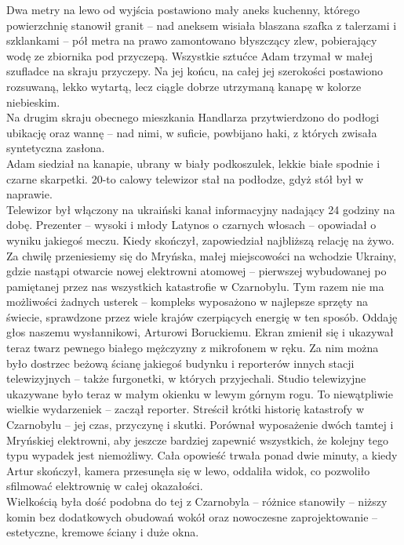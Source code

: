 \documentclass[../MAIN.tex]{subfiles}
\begin{document}
Dwa metry na lewo od wyjścia postawiono mały aneks kuchenny, którego powierzchnię stanowił granit -- nad aneksem wisiała blaszana szafka z talerzami i szklankami -- pół metra na prawo zamontowano błyszczący zlew, pobierający wodę ze zbiornika pod przyczepą. Wszystkie sztućce Adam trzymał w małej szufladce na skraju przyczepy. Na jej końcu, na całej jej szerokości postawiono rozsuwaną, lekko wytartą, lecz ciągle dobrze utrzymaną kanapę w kolorze niebieskim. \\
Na drugim skraju obecnego mieszkania Handlarza przytwierdzono do podłogi ubikację oraz wannę -- nad nimi, w suficie, powbijano haki, z których zwisała syntetyczna zasłona. \\
Adam siedział na kanapie, ubrany w biały podkoszulek, lekkie białe spodnie i czarne skarpetki. 20-to calowy telewizor stał na podłodze, gdyż stół był w naprawie. \\
Telewizor był włączony na ukraiński kanał informacyjny nadający 24 godziny na dobę. Prezenter -- wysoki i młody Latynos o czarnych włosach -- opowiadał o wyniku jakiegoś meczu. Kiedy skończył, zapowiedział najbliższą relację na żywo.
%
\sx Za chwilę przeniesiemy się do Mryńska, małej miejscowości na wchodzie Ukrainy, gdzie nastąpi otwarcie nowej elektrowni atomowej -- pierwszej wybudowanej po pamiętanej przez nas wszystkich katastrofie w Czarnobylu. Tym razem nie ma możliwości żadnych usterek -- kompleks wyposażono w najlepsze sprzęty na świecie, sprawdzone przez wiele krajów czerpiących energię w ten sposób. Oddaję głos naszemu wysłannikowi, Arturowi Boruckiemu.
\qd
Ekran zmienił się i ukazywał teraz twarz pewnego białego mężczyzny z mikrofonem w ręku. Za nim można było dostrzec beżową ścianę jakiegoś budynku i reporterów innych stacji telewizyjnych -- także furgonetki, w których przyjechali. Studio telewizyjne ukazywane było teraz w małym okienku w lewym górnym rogu.
%
\sx To niewątpliwie wielkie wydarzenie\3k -- zaczął reporter.
\qd
Streścił krótki historię katastrofy w Czarnobylu -- jej czas, przyczynę i skutki. Porównał wyposażenie dwóch tamtej i Mryńskiej elektrowni, aby jeszcze bardziej zapewnić wszystkich, że kolejny tego typu wypadek jest niemożliwy. Cała opowieść trwała ponad dwie minuty, a kiedy Artur skończył, kamera przesunęła się w lewo, oddaliła widok, co pozwoliło sfilmować elektrownię w całej okazałości. \\
Wielkością była dość podobna do tej z Czarnobyla -- różnice stanowiły -- niższy komin bez dodatkowych obudowań wokół oraz nowoczesne zaprojektowanie -- estetyczne, kremowe ściany i duże okna. \\
\end{document}
